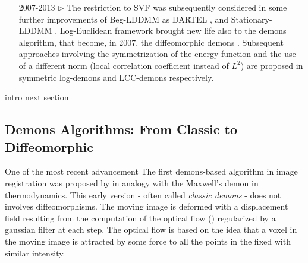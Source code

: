\begin{enumerate}
	\item[2007-2013 $\triangleright$] The restriction to SVF was subsequently considered in some further improvements of Beg-LDDMM  as DARTEL \cite{Ashburner:07}, and Stationary-LDDMM  \cite{hernandez2007registration}. 
	Log-Euclidean framework brought new life also to the demons algorithm, that  become, in 2007, the diffeomorphic demons \cite{vercauteren2007non}.
	Subsequent approaches involving the symmetrization of the energy function and the use of a different norm (local correlation coefficient instead of $L^{2}$) are proposed in symmetric log-demons \cite{vercauteren08} and LCC-demons \cite{lorenzi2013lcc} respectively.
	
\end{enumerate}

intro next section


\subsection{Demons Algorithms: From Classic to Diffeomorphic}

One of the most recent advancement
The first demons-based algorithm in image registration was proposed by \cite{thirion1998image} in analogy with the Maxwell's demon in thermodynamics. This early version - often called \emph{classic demons} - does not involves diffeomorphisms. 
The moving image is deformed with a displacement field resulting from the computation of the optical flow (\cite{horn1981determining}) regularized by a gaussian filter at each step. The optical flow is based on the idea that a voxel in the moving image is attracted by some force to all the points in the fixed with similar intensity. 

